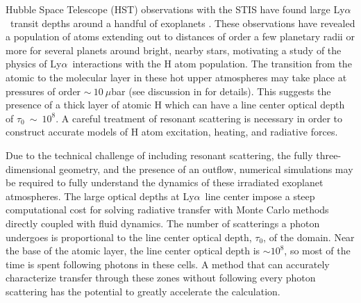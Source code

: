 \documentclass[linenumbers]{aastex63}
\newcommand\lya{Ly$\alpha$\ }
\begin{document}
Hubble Space Telescope (HST) observations with the STIS have found large \lya transit depths around a handful of exoplanets \citep{2003Natur.422..143V, 2012A&A...543L...4L, 2012A&A...547A..18E, 2015Natur.522..459E,  2017A&A...597A..26B, 2017A&A...599L...3B, 2017A&A...602A.106B, 2018A&A...620A.147B, 2019AJ....158...50W, 2019EPSC...13.1928L, 2020ApJ...888L..21G,2021arXiv210309864B}. These observations have revealed a population of atoms extending out to distances of order a few planetary radii or more for several planets around bright, nearby stars, motivating a study of the physics of \lya interactions with the H atom population. The transition from the atomic to the molecular layer in these hot upper atmospheres may take place at pressures of order ${\sim}\ 10\ \mu$bar (see discussion in \citet{2017ApJ...851..150H} for details). This suggests the presence of a thick layer of atomic H which can have a line center optical depth of $\tau_0\ {\sim}\ 10^8$. A careful treatment of resonant scattering is necessary in order to construct accurate models of H atom excitation, heating, and radiative forces. 

Due to the technical challenge of including resonant scattering, the fully three-dimensional geometry, and the presence of an outflow, numerical simulations may be required to fully understand the dynamics of these irradiated exoplanet atmospheres. The large optical depths at \lya line center impose a steep computational cost for solving radiative transfer with Monte Carlo methods directly coupled with fluid dynamics. The number of scatterings a photon undergoes is proportional to the line center optical depth, $\tau_0$, of the domain.  Near the base of the atomic layer, the line center optical depth is ${\sim}10^8$, so most of the time is spent following photons in these cells. A method that can accurately characterize transfer through these zones without following every photon scattering has the potential to greatly accelerate the calculation.
\end{document}
